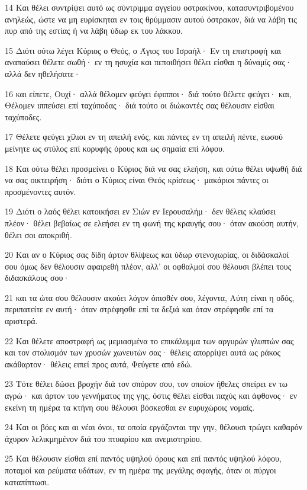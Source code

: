 \par 14 Και θέλει συντρίψει αυτό ως σύντριμμα αγγείου οστρακίνου, κατασυντριβομένου ανηλεώς, ώστε να μη ευρίσκηται εν τοις θρύμμασιν αυτού όστρακον, διά να λάβη τις πυρ από της εστίας ή να λάβη ύδωρ εκ του λάκκου.
\par 15 Διότι ούτω λέγει Κύριος ο Θεός, ο Άγιος του Ισραήλ· Εν τη επιστροφή και αναπαύσει θέλετε σωθή· εν τη ησυχία και πεποιθήσει θέλει είσθαι η δύναμίς σας· αλλά δεν ηθελήσατε·
\par 16 και είπετε, Ουχί· αλλά θέλομεν φεύγει έφιπποι· διά τούτο θέλετε φεύγει· και, Θέλομεν ιππεύσει επί ταχύποδας· διά τούτο οι διώκοντές σας θέλουσιν είσθαι ταχύποδες.
\par 17 Θέλετε φεύγει χίλιοι εν τη απειλή ενός, και πάντες εν τη απειλή πέντε, εωσού μείνητε ως στύλος επί κορυφής όρους και ως σημαία επί λόφου.
\par 18 Και ούτω θέλει προσμείνει ο Κύριος διά να σας ελεήση, και ούτω θέλει υψωθή διά να σας οικτειρήση· διότι ο Κύριος είναι Θεός κρίσεως· μακάριοι πάντες οι προσμένοντες αυτόν.
\par 19 Διότι ο λαός θέλει κατοικήσει εν Σιών εν Ιερουσαλήμ· δεν θέλεις κλαύσει πλέον· θέλει βεβαίως σε ελεήσει εν τη φωνή της κραυγής σου· όταν ακούση αυτήν, θέλει σοι αποκριθή.
\par 20 Και αν ο Κύριος σας δίδη άρτον θλίψεως και ύδωρ στενοχωρίας, οι διδάσκαλοί σου όμως δεν θέλουσιν αφαιρεθή πλέον, αλλ' οι οφθαλμοί σου θέλουσι βλέπει τους διδασκάλους σου·
\par 21 και τα ώτα σου θέλουσιν ακούει λόγον όπισθέν σου, λέγοντα, Αύτη είναι η οδός, περιπατείτε εν αυτή· όταν στρέφησθε επί τα δεξιά και όταν στρέφησθε επί τα αριστερά.
\par 22 Και θέλετε αποστραφή ως μεμιασμένα το επικάλυμμα των αργυρών γλυπτών σας και τον στολισμόν των χρυσών χωνευτών σας· θέλεις απορρίψει αυτά ως ράκος ακάθαρτον· θέλεις ειπεί προς αυτά, Φεύγετε από εδώ.
\par 23 Τότε θέλει δώσει βροχήν διά τον σπόρον σου, τον οποίον ήθελες σπείρει εν τω αγρώ· και άρτον του γεννήματος της γης, όστις θέλει είσθαι παχύς και άφθονος· εν εκείνη τη ημέρα τα κτήνη σου θέλουσι βόσκεσθαι εν ευρυχώροις νομαίς.
\par 24 Και οι βόες και αι νέαι όνοι, τα οποία εργάζονται την γην, θέλουσι τρώγει καθαρόν άχυρον λελικμημένον διά του πτυαρίου και ανεμιστηρίου.
\par 25 Και θέλουσιν είσθαι επί παντός υψηλού όρους και επί παντός υψηλού λόφου, ποταμοί και ρεύματα υδάτων, εν τη ημέρα της μεγάλης σφαγής, όταν οι πύργοι καταπίπτωσι.
